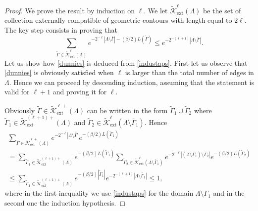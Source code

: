 \documentclass[JEP,XML,SOM,Unicode, NoFloatCountersInSection]{cedram}
\let\mathcal\mathscr
\numberwithin{equation}{section}
\theoremstyle{plain}
\theoremstyle{definition}
\newcommand{\ext}{\mathrm{ext}}
\newcommand{\cK}{{\ensuremath{\mathcal K}} }
\newcommand{\gb}{\beta}
\newcommand{\gG}{\Gamma}
\newcommand{\gL}{\Lambda}
\begin{document}
\begin{proof}
We prove the result by induction on $\ell$. We let $\tilde \cK^{\ell}_{\ext}(\gL)$ be
the set of collection externally compatible of geometric contours with length equal to $2\ell$.
The key step consists in proving that
\begin{equation}\label{industaps}
\sum_{\tilde \gG\in \tilde \cK^{\ell}_{\ext}(\gL)} e^{-2^{-\ell} |\gL\setminus \bar \gG|-(\gb/2) L(\tilde\gG)}\le e^{-2^{-(\ell+1)} |\gL\setminus \bar \gG|}.
\end{equation}
Let us show how \eqref{dunnies} is deduced from \eqref{industaps}.
First let us observe that \eqref{dunnies} is obviously satisfied when $\ell$ is larger than the total number of edges in $\gL$. Hence we can proceed
by descending induction, assuming that the
statement is valid for $\ell+1$ and proving it for $\ell$.

Obviously $\tilde \gG \in \tilde \cK^{\ell+}_{\ext}(\gL)$ can be written in the form $\tilde \gG_1\cup \tilde \gG_2$ where $\tilde \gG_1\in \tilde \cK^{(\ell+1)+}_{\ext}(\gL)$
and $\tilde \gG_2\in \tilde\cK^{\ell}_{\ext}(\gL \setminus \bar \gG_1)$.
Hence\vspace*{-3pt}
\begin{multline*}
\sum_{\tilde \gG\in \tilde \cK^{\ell+}_{\ext}(\gL)} e^{-2^{-\ell} |\gL\setminus \bar \gG| }e^{-(\gb/2) L(\tilde\gG_1)}\\[-5pt]
=\sum_{\tilde \gG_1\in \tilde \cK^{(\ell+1)+}_{\ext}(\gL)} e^{-(\gb/2) L(\tilde\gG_1)}\sum_{\tilde \gG_2\in \tilde \cK^{\ell}_{\ext}(\gL\setminus \bar \gG_1)}
e^{-2^{-\ell} |(\gL\setminus \bar \gG_1)\setminus \bar \gG_2|} e^{-(\gb/2) L(\tilde\gG_2)}
\\ \le \sum_{\tilde \gG_1\in \tilde \cK^{(\ell+1)+}_{\ext}(\gL)} e^{-(\gb/2) |\tilde\gG_1|} e^{-2^{-(\ell+1)} |\gL\setminus \bar \gG_1|} \le 1,
\end{multline*}
where in the first inequality we use \eqref{industaps} for the domain $\gL\setminus \bar \gG_1$ and in the second one the induction hypothesis.


\end{proof}
\end{document}
